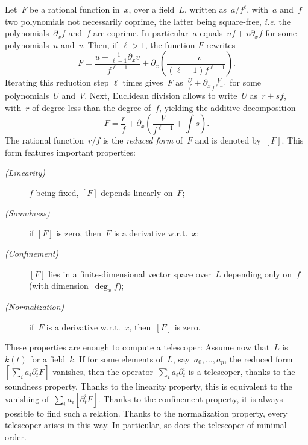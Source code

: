 \documentclass{sig-alternate}
\begin{document}
\noindent Let~$F$ be a rational function in~$x$, over a field~$L$, written as~$a/f^\ell$, with~$a$ and~$f$ two polynomials not necessarily coprime, the latter being square-free, \emph{i.e.} the polynomials~$\partial_x f$ and~$f$ are coprime.
In particular~$a$ equals~$uf+v \partial_x f$ for some polynomials~$u$ and~$v$.
Then, if~$\ell>1$, the function $F$ rewrites 
\[ F  = \frac{u+ \tfrac{1}{\ell-1} \partial_x v}{f^{\ell-1}}+\partial_x\left( \frac{-v}{(\ell-1)f^{\ell-1}} \right). \]
Iterating this reduction step $\ell$ times gives~$F$ as~$\frac{U}{f}+\partial_x\frac{V}{f^{\ell-1}}$
for some polynomials~$U$ and~$V$.
Next, Euclidean division allows to write~$U$ as~$r+sf$, with~$r$ of degree less than the degree of~$f$, yielding the additive decomposition
\[ F = \frac{r}{f} + \partial_x\left(\frac{V}{f^{\ell-1}}+ {\textstyle \int}s \right). \]
The rational function~$r/f$ is the \emph{reduced form} of~$F$ and is denoted by~$[F]$.
This form features important properties:
\begin{description}
  \item[\normalfont\emph{(Linearity)}] $f$ being fixed, $[F]$ depends linearly on~$F$;
  \item[\normalfont\emph{(Soundness)}] if $[F]$ is zero, then~$F$ is a derivative w.r.t.~$x$;
  \item[\normalfont\emph{(Confinement)}] $[F]$ lies in a finite-dimensional vector space over~$L$ depending only on~$f$ (with dimension~$\deg_x f$);
  \item[\normalfont\emph{(Normalization)}] if~$F$ is a derivative w.r.t.~$x$, then~$[F]$ is zero.
\end{description}
These properties are enough to compute a telescoper:
Assume now that~$L$ is~$k(t)$ for a field~$k$.
If for some elements of~$L$, say~$a_0,\dotsc,a_p$, the reduced form~$\left[\sum_i a_i \partial^i_t F\right]$ vanishes, then the operator~$\sum_i a_i\partial_t^i$ is a telescoper, thanks to the soundness property.
Thanks to the linearity property, this is equivalent to the vanishing of~$\sum_i a_i \left[\partial^i_t F\right]$.
Thanks to the confinement property, it is always possible to find such a relation.
Thanks to the normalization property, every telescoper arises in this way. In particular, so does the  telescoper of minimal order.
\end{document}

